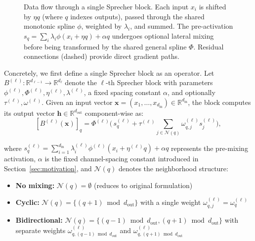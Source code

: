 \documentclass{article}
\theoremstyle{plain}
\theoremstyle{definition}
\theoremstyle{remark}
\begin{document}
\begin{figure}[ht]
\begin{tikzpicture}[
        >=latex, 
        node distance=1.0cm and 1.2cm, 
        font=\small
    ]
    \end{tikzpicture}
    \caption{Data flow through a single Sprecher block. Each input $x_i$ is shifted by $\eta q$ (where $q$ indexes outputs), passed through the shared monotonic spline $\phi$, weighted by $\lambda_i$, and summed. The pre-activation $s_q = \sum_i \lambda_i \phi(x_i + \eta q) + \alpha q$ undergoes optional lateral mixing before being transformed by the shared general spline $\Phi$. Residual connections (dashed) provide direct gradient paths.}
    \label{fig:block_flow}
\end{figure}

Concretely, we first define a single Sprecher block as an operator. Let $B^{(\ell)}: \mathbb{R}^{d_{\ell-1}} \to \mathbb{R}^{d_\ell}$ denote the $\ell$-th Sprecher block with parameters $\phi^{(\ell)}, \Phi^{(\ell)}, \eta^{(\ell)}, \lambda^{(\ell)}$, a fixed spacing constant $\alpha$, and optionally $\tau^{(\ell)}, \omega^{(\ell)}$. Given an input vector $\mathbf{x} = (x_1, \dots, x_{d_{\mathrm{in}}}) \in \mathbb{R}^{d_{\mathrm{in}}}$, the block computes its output vector $\mathbf{h} \in \mathbb{R}^{d_{\mathrm{out}}}$ component-wise as:
\begin{equation}\label{eq:SN}
[B^{(\ell)}(\mathbf{x})]_q = \Phi^{(\ell)}\Biggl(\,s_q^{(\ell)} + \tau^{(\ell)} \sum_{j \in \mathcal{N}(q)} \omega_{q,j}^{(\ell)} s_j^{(\ell)}\Biggr),
\end{equation}

where $s_q^{(\ell)} = \sum_{i=1}^{d_{\mathrm{in}}} \lambda_i^{(\ell)} \phi^{(\ell)}(x_i + \eta^{(\ell)} q) + \alpha q$ represents the pre-mixing activation, $\alpha$ is the fixed channel-spacing constant introduced in Section~\ref{sec:motivation}, and $\mathcal{N}(q)$ denotes the neighborhood structure:
\begin{itemize}
    \item \textbf{No mixing:} $\mathcal{N}(q) = \emptyset$ (reduces to original formulation)
    \item \textbf{Cyclic:} $\mathcal{N}(q) = \{(q+1) \bmod d_{\mathrm{out}}\}$ with a single weight $\omega_{q,j}^{(\ell)} = \omega_q^{(\ell)}$
    \item \textbf{Bidirectional:} $\mathcal{N}(q) = \{(q-1) \bmod d_{\mathrm{out}}, (q+1) \bmod d_{\mathrm{out}}\}$ with separate weights $\omega_{q,(q-1)\bmod d_{\mathrm{out}}}^{(\ell)}$ and $\omega_{q,(q+1)\bmod d_{\mathrm{out}}}^{(\ell)}$
\end{itemize}
\end{document}
